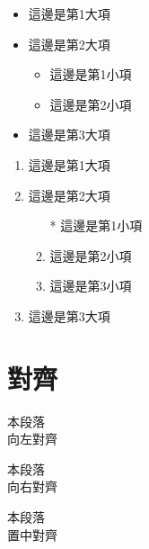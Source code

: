 \begin{itemize}
    \item 這邊是第1大項
    \item 這邊是第2大項
        \begin{itemize}
            \item 這邊是第1小項
            \item 這邊是第2小項
        \end{itemize}
    \item 這邊是第3大項
\end{itemize}

\begin{enumerate}
    \item 這邊是第1大項
    \item 這邊是第2大項
        \begin{enumerate}
            \item[*] 這邊是第1小項
            \item 這邊是第2小項
            \item 這邊是第3小項
        \end{enumerate}
    \item 這邊是第3大項
\end{enumerate}

\newpage

\section{對齊}
\begin{flushleft}
    本段落\\
    向左對齊
\end{flushleft}

\begin{flushright}
    本段落\\
    向右對齊
\end{flushright}

\begin{center}
    本段落\\
    置中對齊
\end{center}

\newpage

